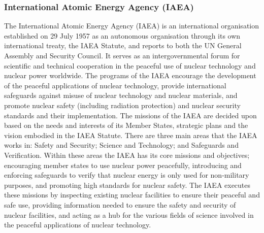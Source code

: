 \documentclass[twoside,titlepage,11pt,twocolumn,a4paper]{article}
\begin{document}
\subsubsection{International Atomic Energy Agency (IAEA)}
The International Atomic Energy Agency (IAEA) is an international
organisation established on 29 July 1957 as an autonomous organisation
through its own international treaty, the IAEA Statute, and reports to
both the UN General Assembly and Security Council. It serves as an
intergovernmental forum for scientific and technical cooperation in
the peaceful use of nuclear technology and nuclear power
worldwide. The programs of the IAEA encourage the development of the
peaceful applications of nuclear technology, provide international
safeguards against misuse of nuclear technology and nuclear materials,
and promote nuclear safety (including radiation protection) and
nuclear security standards and their implementation.  The missions of
the IAEA are decided upon based on the needs and interests of its
Member States, strategic plans and the vision embodied in the IAEA
Statute. There are three main areas that the IAEA works in: Safety and
Security; Science and Technology; and Safeguards and
Verification. Within these areas the IAEA has its core missions and
objectives; encouraging member states to use nuclear power peacefully,
introducing and enforcing safeguards to verify that nuclear energy is
only used for non-military purposes, and promoting high standards for
nuclear safety.  The IAEA executes these missions by inspecting
existing nuclear facilities to ensure their peaceful and safe use,
providing information needed to ensure the safety and security of
nuclear facilities, and acting as a hub for the various fields of
science involved in the peaceful applications of nuclear technology.
\end{document}
